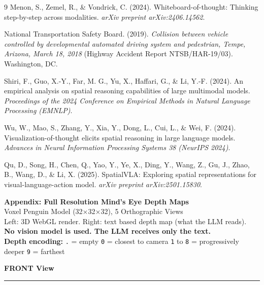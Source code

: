 \documentclass[stu,12pt,a4paper,floatsintext]{apa7}
\begin{document}
\begin{thebibliography}{9}
Menon, S., Zemel, R., \& Vondrick, C. (2024). Whiteboard-of-thought: Thinking step-by-step across modalities. \emph{arXiv preprint arXiv:2406.14562}.

{National Transportation Safety Board}. (2019). \emph{Collision between vehicle controlled by developmental automated driving system and pedestrian, Tempe, Arizona, March 18, 2018} (Highway Accident Report NTSB/HAR-19/03). Washington, DC.

Shiri, F., Guo, X.-Y., Far, M. G., Yu, X., Haffari, G., \& Li, Y.-F. (2024). An empirical analysis on spatial reasoning capabilities of large multimodal models. \emph{Proceedings of the 2024 Conference on Empirical Methods in Natural Language Processing (EMNLP)}.

Wu, W., Mao, S., Zhang, Y., Xia, Y., Dong, L., Cui, L., \& Wei, F. (2024). Visualization-of-thought elicits spatial reasoning in large language models. \emph{Advances in Neural Information Processing Systems 38 (NeurIPS 2024)}.

Qu, D., Song, H., Chen, Q., Yao, Y., Ye, X., Ding, Y., Wang, Z., Gu, J., Zhao, B., Wang, D., \& Li, X. (2025). SpatialVLA: Exploring spatial representations for visual-language-action model. \emph{arXiv preprint arXiv:2501.15830}.

\end{thebibliography}

\newpage
\begin{center}
{\large\bfseries Appendix: Full Resolution Mind's Eye Depth Maps}\\[6pt]
\normalsize Voxel Penguin Model (32$\times$32$\times$32), 5 Orthographic Views\\
Left: 3D WebGL render. Right: text based depth map (what the LLM reads).\\
\textbf{No vision model is used. The LLM receives only the text.}\\[6pt]
\small\textbf{Depth encoding:} \texttt{.} = empty \quad \texttt{0} = closest to camera \quad \texttt{1} to \texttt{8} = progressively deeper \quad \texttt{9} = farthest
\end{center}

\vspace{12pt}

\noindent\textbf{FRONT View}\\[-4pt]
\rule{\textwidth}{0.4pt}
\end{document}
